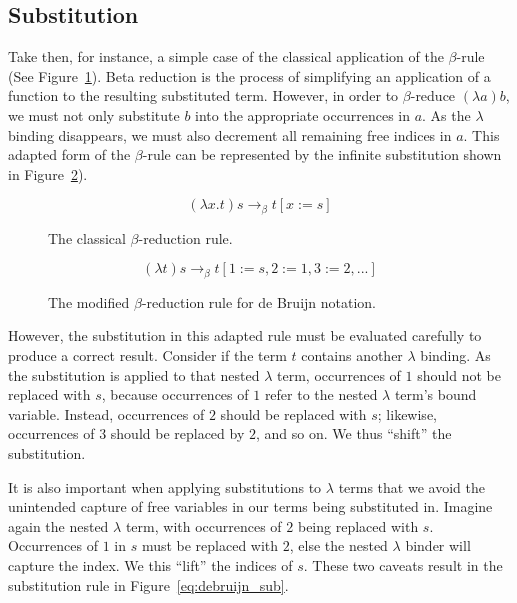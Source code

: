 \subsection{Substitution}
\label{sub:lambda_calc_subst}

Take then, for instance, a simple case of the classical application of the $\beta$-rule (See Figure~\ref{eq:beta_rule}). Beta reduction is the process of simplifying an application of a function to the resulting substituted term. However, in order to $\beta$-reduce $(\lambda a)b$, we must not only substitute $b$ into the appropriate occurrences in $a$. As the $\lambda$ binding disappears, we must also decrement all remaining free indices in $a$. This adapted form of the $\beta$-rule can be represented by the infinite substitution shown in Figure~\ref{eq:beta_rule2}).\citep{Abadi-Cardelli-Curien-Levy-1990}

\begin{figure}[h]
\begin{equation*}
(\lambda x.t)s \to_{\beta} t[x := s]
\end{equation*}
\caption{The classical $\beta$-reduction rule.}
\label{eq:beta_rule}
\end{figure}

\begin{figure}[h]
\begin{equation*}
(\lambda t)s \to_{\beta} t[1 := s, 2 := 1, 3 := 2, ...]
\end{equation*}
\caption{The modified $\beta$-reduction rule for de Bruijn notation.}
\label{eq:beta_rule2}
\end{figure}

However, the substitution in this adapted rule must be evaluated carefully to produce a correct result. Consider if the term $t$ contains another $\lambda$ binding. As the substitution is applied to that nested $\lambda$ term, occurrences of $1$ should not be replaced with $s$, because occurrences of $1$ refer to the nested $\lambda$ term's bound variable. Instead, occurrences of $2$ should be replaced with $s$; likewise, occurrences of $3$ should be replaced by $2$, and so on. We thus ``shift'' the substitution.\citep{Abadi-Cardelli-Curien-Levy-1990}

It is also important when applying substitutions to $\lambda$ terms that we avoid the unintended capture of free variables in our terms being substituted in. Imagine again the nested $\lambda$ term, with occurrences of $2$ being replaced with $s$. Occurrences of $1$ in $s$ must be replaced with $2$, else the nested $\lambda$ binder will capture the index. We this ``lift'' the indices of $s$. These two caveats result in the substitution rule in Figure~\ref{eq:debruijn_sub}.\citep{Abadi-Cardelli-Curien-Levy-1990}

